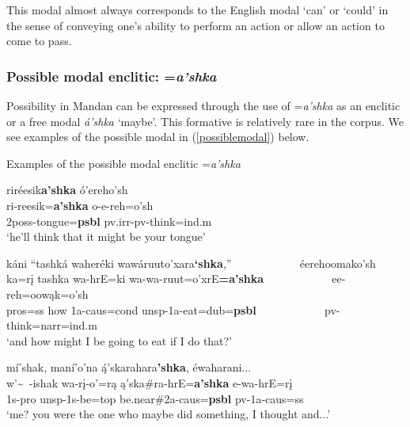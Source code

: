 This modal almost always corresponds to the English modal `can' or `could' in the sense of conveying one's ability to perform an action or allow an action to come to pass.

\subsubsection{Possible modal enclitic: =\textit{a'shka}}
\largerpage
Possibility in Mandan can be expressed through the use of =\textit{a'shka} as an enclitic or a free modal \textit{á'shka} `maybe'. This formative is relatively rare in the corpus. We see examples of the possible modal in (\ref{possiblemodal}) below.

\begin{exe}

\item\label{possiblemodal} Examples of the possible modal enclitic =\textit{a'shka}

	\begin{xlist}
	
	\item\label{possiblemodal1} \glll riréesik\textbf{a'shka} ó'{e}reho'sh\\
	ri-reesik=\textbf{a'shka} o-e-reh=o'sh\\
	2poss-\textnormal{tongue}=\textbf{psbl} pv.irr-pv-\textnormal{think}=ind.m\\
	\glt `he'll think that it might be your tongue' \citep[189]{hollow1973a}

	\item\label{possiblemodal2}
	\glll káni ``tashká waheréki wawáruuto'xara\textbf{`shka},'' ~ ~ ~ ~ ~ ~ ~  éerehoomako'sh\\
	ka=rį tashka wa-hrE=ki wa-wa-ruut=o'xrE\textbf{=a'shka} ~ ~ ~ ~ ~ ~ ~ ee-reh=oowąk=o'sh\\
	pros=ss \textnormal{how} 1a-caus=cond unsp-1a-\textnormal{eat}=dub=\textbf{psbl} ~ ~ ~ ~ ~ ~ ~  pv-\textnormal{think}=narr=ind.m\\
	\glt `and how might I be going to eat if I do that?' \citep[46]{hollow1973b}

	\item\label{possiblemodal3}
	\glll mí'shak, maní'o'na ą́'skarahara\textbf{'shka}, éwaharani...\\
	w'\~~-ishak wa-rį-o'=rą ą'ska\#ra-hrE=\textbf{a'shka} e-wa-hrE=rį\\
	1s-\textnormal{pro} unsp-1s-\textnormal{be}=top \textnormal{be.near}\#2a-caus=\textbf{psbl} pv-1a-caus=ss\\
	\glt `me? you were the one who maybe did something, I thought and...' \citep[238]{hollow1973b}


\end{xlist}
\end{exe}
